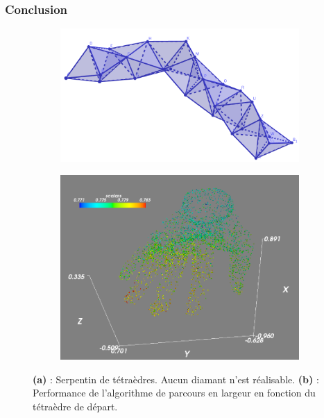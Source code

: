 \documentclass[9pt]{beamer}
\begin{document}
\begin{frame}
\small
\frametitle{Conclusion}
\vspace{-6.5pt}
\begin{figure}[H]
\centering
\begin{subfigure}{.5\textwidth}
  \centering
  \includegraphics[scale=0.12]{../Images/serpentin}
  \caption{}
\end{subfigure}%
\begin{subfigure}{.5\textwidth}
  \centering
  \includegraphics[scale=0.11]{../Images/bfs_starting}
  \caption{}
\end{subfigure}
\vspace{-5.5pt}
\caption{\textbf{(a)} : Serpentin de tétraèdres. Aucun diamant n'est réalisable. \textbf{(b)} : Performance de l’algorithme de parcours en largeur en fonction du tétraèdre de départ.}
\end{figure}
\vspace{-6.5pt}

\end{frame}
\end{document}
